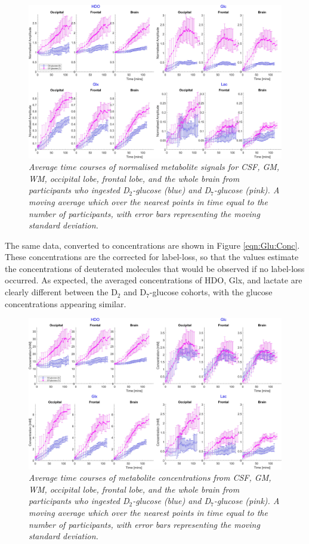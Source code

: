 \documentclass[class=article, crop=false]{standalone}
\begin{document}
\begin{figure}
    \centering
    \includegraphics[width = 1\textwidth]{Figures/Glucose/Avg_Amp.png}
    \caption{\textit{Average time courses of normalised metabolite signals for CSF, GM, WM, occipital lobe, frontal lobe, and the whole brain from participants who ingested D$_2$-glucose (blue) and D$_7$-glucose (pink). A moving average which over the nearest points in time equal to the number of participants, with error bars representing the moving standard deviation.}}
    \label{fig:Glu:Avg_Amp}
\end{figure}

The same data, converted to concentrations are shown in Figure \ref{eqn:Glu:Conc}. These concentrations are the corrected for label-loss, so that the values estimate the concentrations of deuterated molecules that would be observed if no label-loss occurred. As expected, the averaged concentrations of HDO, Glx, and lactate are clearly different between the D$_2$ and D$_7$-glucose cohorts, with the glucose concentrations appearing similar. 

\begin{figure}
    \centering
    \includegraphics[width = 1\textwidth]{Figures/Glucose/Avg_Conc.png}
    \caption{\textit{Average time courses of metabolite concentrations from CSF, GM, WM, occipital lobe, frontal lobe, and the whole brain from participants who ingested D$_2$-glucose (blue) and D$_7$-glucose (pink). A moving average which over the nearest points in time equal to the number of participants, with error bars representing the moving standard deviation.}}
    \label{fig:Glu:Avg_Conc}
\end{figure}
\end{document}
